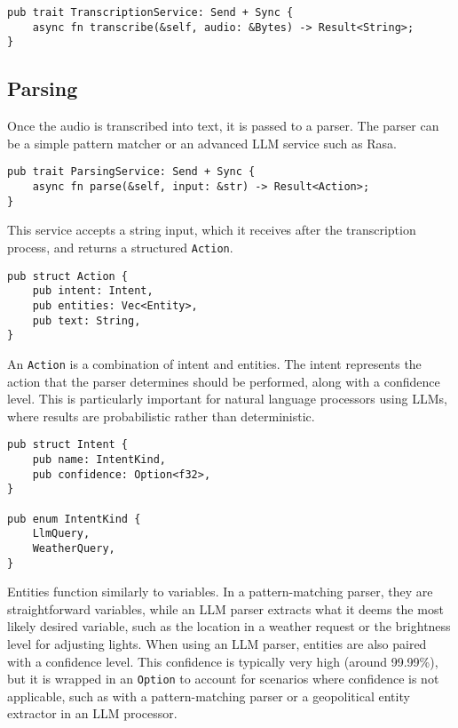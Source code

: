 \begin{verbatim}
pub trait TranscriptionService: Send + Sync {
    async fn transcribe(&self, audio: &Bytes) -> Result<String>;
}
\end{verbatim}

\subsection{Parsing}
Once the audio is transcribed into text, it is passed to a parser.
The parser can be a simple pattern matcher or an advanced LLM service such as Rasa.

\begin{verbatim}
pub trait ParsingService: Send + Sync {
    async fn parse(&self, input: &str) -> Result<Action>;
}
\end{verbatim}

This service accepts a string input, which it receives after the transcription process, and returns a structured \texttt{Action}.

\begin{verbatim}
pub struct Action {
    pub intent: Intent,
    pub entities: Vec<Entity>,
    pub text: String,
}
\end{verbatim}

An \texttt{Action} is a combination of intent and entities.
The intent represents the action that the parser determines should be performed, along with a confidence level.
This is particularly important for natural language processors using LLMs, where results are probabilistic rather than deterministic.

\begin{verbatim}
pub struct Intent {
    pub name: IntentKind,
    pub confidence: Option<f32>,
}

pub enum IntentKind {
    LlmQuery,
    WeatherQuery,
}
\end{verbatim}

Entities function similarly to variables. In a pattern-matching parser, they are straightforward variables,
while an LLM parser extracts what it deems the most likely desired variable,
such as the location in a weather request or the brightness level for adjusting lights.
When using an LLM parser, entities are also paired with a confidence level.
This confidence is typically very high (around 99.99\%), but it is wrapped in an \texttt{Option}
to account for scenarios where confidence is not applicable,
such as with a pattern-matching parser or a geopolitical entity extractor in an LLM processor.

